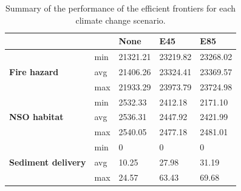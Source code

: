 \begin{table}[]
\centering
\caption[Summary of objective achievement across climate scenarios]{Summary of the performance of the efficient frontiers for each climate change scenario.}
\label{tab:frontiersSummary}
\begin{tabular}{lllll}
\multicolumn{2}{l|}{}                                                  & \textbf{None} & \textbf{E45} & \textbf{E85} \\ \hline
\multirow{3}{*}{\textbf{Fire hazard}}       & \multicolumn{1}{l|}{min} & 21321.21      & 23219.82     & 23268.02     \\
                                            & \multicolumn{1}{l|}{avg} & 21406.26      & 23324.41     & 23369.57     \\
                                            & \multicolumn{1}{l|}{max} & 21933.29      & 23973.79     & 23724.98     \\ \hline
\multirow{3}{*}{\textbf{NSO habitat}}       & \multicolumn{1}{l|}{min} & 2532.33       & 2412.18      & 2171.10      \\
                                            & \multicolumn{1}{l|}{avg} & 2536.31       & 2447.92      & 2421.99      \\
                                            & \multicolumn{1}{l|}{max} & 2540.05       & 2477.18      & 2481.01      \\ \hline
\multirow{3}{*}{\textbf{Sediment delivery}} & \multicolumn{1}{l|}{min} & 0             & 0            & 0            \\
                                            & \multicolumn{1}{l|}{avg} & 10.25         & 27.98        & 31.19        \\
                                            & \multicolumn{1}{l|}{max} & 24.57         & 63.43        & 69.68        
\end{tabular}
\end{table}


